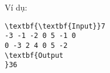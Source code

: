 Ví dụ:
\begin{verbatim}
\textbf{\textbf{Input}}7
-3 -1 -2 0 5 -1 0
0 -3 2 4 0 5 -2
\textbf{Output
}36 \end{verbatim}